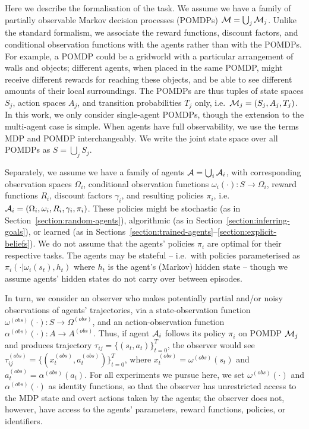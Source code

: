 \documentclass{article}
\begin{document}
Here we describe the formalisation of the task. We assume we have a family of partially observable Markov decision processes (POMDPs) $\mathcal{M} = \bigcup_{j} \mathcal{M}_j$. Unlike the standard formalism, we associate the reward functions, discount factors, and conditional observation functions with the agents rather than with the POMDPs. For example, a POMDP could be a gridworld with a particular arrangement of walls and objects; different agents, when placed in the same POMDP, might receive different rewards for reaching these objects, and be able to see different amounts of their local surroundings. The POMDPs are thus tuples of state spaces $S_j$, action spaces $A_j$, and transition probabilities $T_j$ only, i.e.\ $\mathcal{M}_j = (S_j, A_j, T_j)$. In this work, we only consider single-agent POMDPs, though the extension to the multi-agent case is simple. When agents have full observability, we use the terms MDP and POMDP interchangeably. We write the joint state space over all POMDPs as $S = \bigcup_j S_j$.

Separately, we assume we have a family of agents $\mathcal{A} = \bigcup_i \mathcal{A}_i$, with corresponding observation spaces $\Omega_i$, conditional observation functions $\omega_i(\cdot): S \rightarrow \Omega_i$, reward functions $R_i$, discount factors $\gamma_i$, and resulting policies $\pi_i$, i.e.\ $\mathcal{A}_i = (\Omega_i, \omega_i, R_i, \gamma_i, \pi_i)$. These policies might be stochastic (as in Section~\ref{section:random-agents}), algorithmic (as in Section~\ref{section:inferring-goals}), or learned (as in Sections~\ref{section:trained-agents}--\ref{section:explicit-beliefs}). We do not assume that the agents' policies $\pi_i$ are optimal for their respective tasks. The agents may be stateful -- i.e.\ with policies parameterised as $\pi_i(\cdot | \omega_i(s_t), h_t)$ where $h_t$ is the agent's (Markov) hidden state -- though we assume agents' hidden states do not carry over between episodes. 

In turn, we consider an observer who makes potentially partial and/or noisy observations of agents' trajectories, via a state-observation function $\omega^{(obs)}(\cdot): S \rightarrow \Omega^{(obs)}$, and an action-observation function $\alpha^{(obs)}(\cdot): A \rightarrow A^{(obs)}$. Thus, if agent $\mathcal{A}_i$ follows its policy $\pi_i$ on POMDP $\mathcal{M}_j$ and produces trajectory $\tau_{ij} = \{(s_t, a_t)\}_{t=0}^{T}$, the observer would see $\tau_{ij}^{(obs)} = \{(x_t^{(obs)}, a_t^{(obs)})\}_{t=0}^{T}$, where $x_t^{(obs)} = \omega^{(obs)}(s_t)$ and $a_t^{(obs)} = \alpha^{(obs)}(a_t)$. For all experiments we pursue here, we set $\omega^{(obs)}(\cdot)$ and $\alpha^{(obs)}(\cdot)$ as identity functions, so that the observer has unrestricted access to the MDP state and overt actions taken by the agents; the observer does not, however, have access to the agents' parameters, reward functions, policies, or identifiers.
\end{document}
